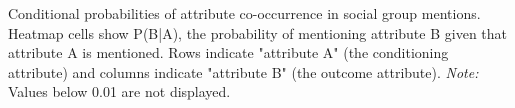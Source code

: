 Conditional probabilities of attribute co-occurrence in social group mentions. Heatmap cells show P(B|A), the probability of mentioning attribute B given that attribute A is mentioned. Rows indicate "attribute A" (the conditioning attribute) and columns indicate "attribute B" (the outcome attribute). \emph{Note:} Values below 0.01 are not displayed.